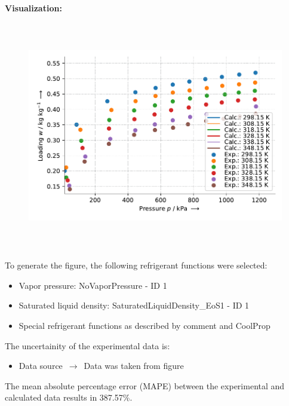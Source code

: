 \textbf{Visualization:}
%
\begin{figure}[!htp]
{\noindent\includegraphics[height=10cm, keepaspectratio]{figs/ads/ads_R-404a_activated_carbon_AquaSorb_2000_DubininAstakhov_1.pdf}}
\end{figure}
%

To generate the figure, the following refrigerant functions were selected:
\begin{itemize}
\item Vapor pressure: NoVaporPressure - ID 1
\item Saturated liquid density: SaturatedLiquidDensity\_EoS1 - ID 1
\item Special refrigerant functions as described by comment and CoolProp
\end{itemize}

The uncertainity of the experimental data is:
\begin{itemize}
\item Data source $\,\to\,$ Data was taken from figure
\end{itemize}

The mean absolute percentage error (MAPE) between the experimental and calculated data results in 387.57\%.
\FloatBarrier
\newpage

